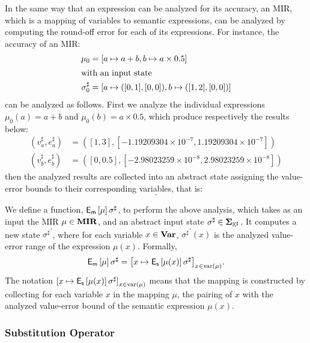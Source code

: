 In the same way that an expression can be analyzed for its accuracy, an MIR,
which is a mapping of variables to semantic expressions, can be analyzed by
computing the round-off error for each of its expressions.  For instance, the
accuracy of an MIR\@:
\begin{align}
    \mu_0 &= [a \mapsto a + b, b \mapsto a \times 0.5] \\
    \intertext{with an input state}
    \sigma^\sharp_0 &= [a \mapsto ([0, 1], [0, 0]), b \mapsto ([1, 2], [0, 0])]
\end{align}
can be analyzed as follows.  First we analyze the individual expressions
$\mu_0(a) = a + b$ and $\mu_0(b) = a \times 0.5$, which produce respectively
the results below:
\begin{align}
    (v^\sharp_a, e^\sharp_a) &= (
        [1, 3], [-1.19209304 \times 10^{-7}, 1.19209304 \times 10^{-7}]) \\
    (v^\sharp_b, e^\sharp_b) &= (
        [0, 0.5], [-2.98023259 \times 10^{-8}, 2.98023259 \times 10^{-8}])
\end{align}
then the analyzed results are collected into an abstract state assigning the
value-error bounds to their corresponding variables, that is:
\begin{equation}
    [a \mapsto (v^\sharp_a, e^\sharp_a), b \mapsto (v^\sharp_b, e^\sharp_b)].
\end{equation}

We define a function, $\operatorname{\mathsf{E}_\mathsf{m}}\left[{\mu}\right]{\sigma^\sharp}$, to perform the
above analysis, which takes as an input the MIR $\mu \in \mathbf{MIR}$, and an
abstract input state $\sigma^\sharp \in \mathbf{\Sigma}_{\mathbb{E}^\sharp}$.  It computes a new
state ${\sigma^\sharp}^\prime$, where for each variable $x \in \mathbf{Var}$,
${\sigma^\sharp}^\prime(x)$ is the analyzed value-error range of the expression
$\mu(x)$.  Formally,
\begin{equation}
    \operatorname{\mathsf{E}_\mathsf{m}}\left[{\mu}\right]{\sigma^\sharp} = {\left[
        x \mapsto \operatorname{\mathsf{E}_\mathsf{s}}\left[{\mu(x)}\right]{\sigma^\sharp}
    \right]}_{x \in \mathrm{var}\left(\mu\right)}.
    \label{po:eq:mir_accuracy}
\end{equation}
The notation ${[x \mapsto \operatorname{\mathsf{E}_\mathsf{s}}\left[{\mu(x)}\right]{\sigma^\sharp}]}_{x \in
\mathrm{var}\left(\mu\right)}$ means that the mapping is constructed by collecting for
each variable $x$ in the mapping $\mu$, the pairing of $x$ with the analyzed
value-error bound of the semantic expression $\mu(x)$.

\subsubsection{Substitution Operator}

